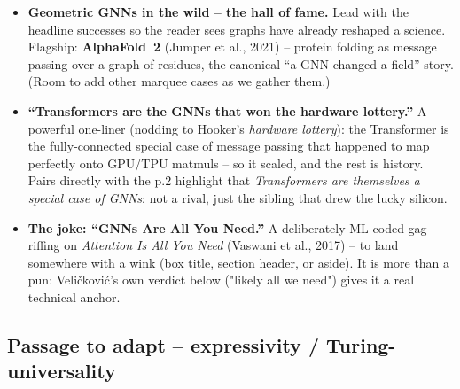 \begin{itemize}
    \item \textbf{Geometric GNNs in the wild -- the hall of fame.} Lead with the
        headline successes so the reader sees graphs have already reshaped a
        science. Flagship: \textbf{AlphaFold~2} (Jumper et al., 2021) -- protein
        folding as message passing over a graph of residues, the canonical
        ``a GNN changed a field'' story. (Room to add other marquee cases as we
        gather them.)
    \item \textbf{``Transformers are the GNNs that won the hardware lottery.''}
        A powerful one-liner (nodding to Hooker's \emph{hardware lottery}): the
        Transformer is the fully-connected special case of message passing that
        happened to map perfectly onto GPU/TPU matmuls -- so it scaled, and the
        rest is history. Pairs directly with the p.2 highlight that
        \emph{Transformers are themselves a special case of GNNs}: not a rival,
        just the sibling that drew the lucky silicon.
    \item \textbf{The joke: ``GNNs Are All You Need.''} A deliberately
        ML-coded gag riffing on \emph{Attention Is All You Need} (Vaswani et
        al., 2017) -- to land somewhere with a wink (box title, section header,
        or aside). It is more than a pun: Veli\v{c}kovi\'c's own verdict below
        ("likely all we need") gives it a real technical anchor.
\end{itemize}

\subsection*{Passage to adapt -- expressivity / Turing-universality}

